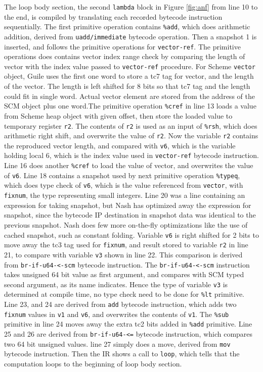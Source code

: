 \documentclass[preprint, numbers]{sigplanconf}
\begin{document}
The loop body section, the second \texttt{lambda} block in Figure
\hyperref[fig:anf]{\ref{fig:anf}} from line 10 to the end, is compiled by
translating each recorded bytecode instruction sequentially. The first
primitive operation contains \texttt{\%add}, which does arithmetic addition,
derived from \texttt{uadd/immediate} bytecode operation. Then a snapshot 1 is
inserted, and follows the primitive operations for \texttt{vector-ref}. The
primitive operations does contains vector index range check by comparing the
length of vector with the index value passed to \texttt{vector-ref}
procedure. For Scheme \texttt{vector} object, Guile uses the first one word to
store a tc7 tag for vector, and the length of the vector. The length is left
shifted for 8 bits so that tc7 tag and the length could fit in single
word. Actual vector element are stored from the address of the SCM object plus
one word.\@ The primitive operation \texttt{\%cref} in line 13 loads a value
from Scheme heap object with given offset, then store the loaded value to
temporary register \texttt{r2}. The contents of \texttt{r2} is used as an
input of \texttt{\%rsh}, which does arithmetic right shift, and overwrite the
value of \texttt{r2}. Now the variable \texttt{r2} contains the reproduced
vector length, and compared with \texttt{v6}, which is the variable holding
local 6, which is the index value used in \texttt{vector-ref} bytecode
instruction. Line 16 does another \texttt{\%cref} to load the value of vector,
and overwrites the value of \texttt{v6}. Line 18 contains a snapshot used by
next primitive operation \texttt{\%typeq}, which does type check of
\texttt{v6}, which is the value referenced from \texttt{vector}, with
\texttt{fixnum}, the type representing small integers. Line 20 was a line
containing an expression for taking snapshot, but Nash has optimized away the
expression for snapshot, since the bytecode IP destination in snapshot data
was identical to the previous snapshot. Nash does few more on-the-fly
optimizations like the use of cached snapshot, such as constant
folding. Variable \texttt{v6} is right shifted for 2 bits to move away the tc3
tag used for \texttt{fixnum}, and result stored to variable \texttt{r2} in
line 21, to compare with variable \texttt{v3} shown in line 22. This
comparison is derived from \texttt{br-if-u64-<-scm} bytecode instruction. The
\texttt{br-if-u64-<-scm} instruction takes unsigned 64 bit value as first
argument, and compares with SCM typed second argument, as its name indicates.
Hence the type of variable \texttt{v3} is determined at compile time, no type
check need to be done for \texttt{\%lt} primitive. Line 23, and 24 are derived
from \texttt{add} bytecode instruction, which adds two \texttt{fixnum} values
in \texttt{v1} and \texttt{v6}, and overwrites the contents of
\texttt{v1}. The \texttt{\%sub} primitive in line 24 moves away the extra tc2
bits added in \texttt{\%add} primitive. Line 25 and 26 are derived from
\texttt{br-if-u64-<=} bytecode instruction, which compares two 64 bit unsigned
values.  line 27 simply does a move, derived from \texttt{mov} bytecode
instruction. Then the IR shows a call to \texttt{loop}, which tells that the
computation loops to the beginning of loop body section.
\end{document}
